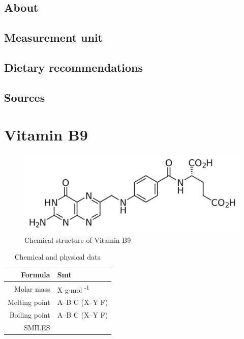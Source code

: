 \documentclass{book}
\begin{document}
\section{About}


\section{Measurement unit}


\section{Dietary recommendations}


\section{Sources}


\chapter{Vitamin B9}
\begin{figure}[h]
	\caption{Chemical structure of Vitamin B9}
	\centering \includegraphics[width=\textwidth]{images/Vitamin_B9_chemical_structure}
\end{figure}

\begin{table}[h]
	\caption{Chemical and physical data}
	\centering \begin{tabular}{| r | l |}
		\hline
		Formula & Smt\\ \hline
		Molar mass & X g$\cdot$mol \textsuperscript{-1}\\ \hline
		Melting point & A--B \degree C (X--Y \degree F)\\ \hline
		Boiling point & A--B \degree C (X--Y \degree F)\\ \hline
		SMILES & \\ \hline
	\end{tabular}
\end{table}
\newpage
\end{document}
